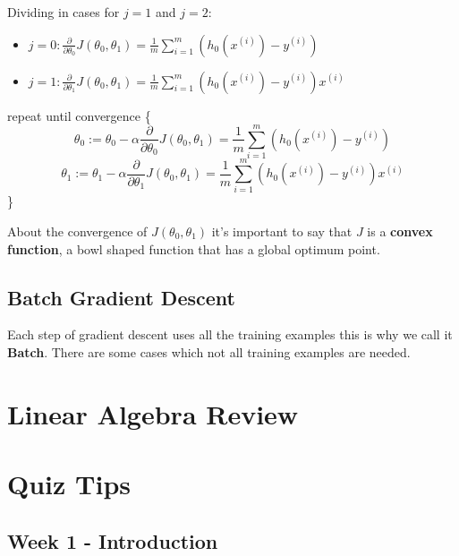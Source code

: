 \documentclass[a4paper]{article}
\begin{document}
Dividing in cases for $j = 1$ and $j = 2$:

\begin{itemize}
\item $j = 0: \frac{\partial}{\partial \theta_0}J(\theta_0,\theta_1) = \frac{1}{m}\sum_{i=1}^m (h_0(x^{(i)}) - y^{(i)})$
\item $j = 1: \frac{\partial}{\partial \theta_1}J(\theta_0,\theta_1) = \frac{1}{m}\sum_{i=1}^m (h_0(x^{(i)}) - y^{(i)}) x^{(i)}$
\end{itemize}

\medskip

repeat until convergence \{
$$
\theta_0 := \theta_0 - \alpha \frac{\partial}{\partial \theta_0}J(\theta_0,\theta_1) = \frac{1}{m}\sum_{i=1}^m (h_0(x^{(i)}) - y^{(i)})
$$
$$
\theta_1 := \theta_1 - \alpha \frac{\partial}{\partial \theta_1}J(\theta_0,\theta_1) = \frac{1}{m}\sum_{i=1}^m (h_0(x^{(i)}) - y^{(i)}) x^{(i)}
$$
\}

About the convergence of $J(\theta_0,\theta_1)$ it's important to say that $J$ is a \textbf{convex function}, a bowl shaped function that has a global optimum point.

\subsection{Batch Gradient Descent}

Each step of gradient descent uses all the training examples this is why we call it \textbf{Batch}. There are some cases which not all training examples are needed.

\section{Linear Algebra Review}


\section{Quiz Tips}

\subsection{Week 1 - Introduction}
\end{document}
